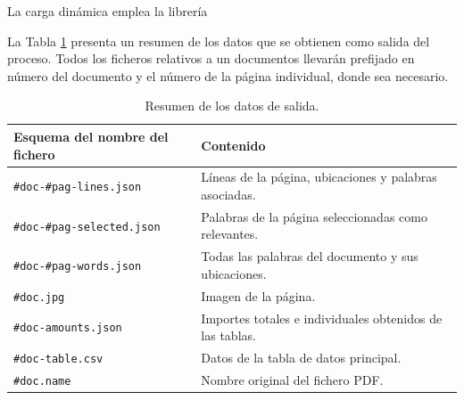 
La carga dinámica emplea la librería 









La Tabla \ref{tab:datos-de-salida} presenta un resumen de los datos que se obtienen como salida del proceso. Todos los ficheros relativos a un documentos llevarán prefijado en número del documento y el número de la página individual, donde sea necesario.

\begin{table}[ht]
    \centering
    \begin{tabular}{l l}
        Esquema del nombre del fichero & Contenido \\
        \hline
        \hline
        \verb|#doc-#pag-lines.json| & Líneas de la página, ubicaciones y palabras asociadas. \\
        \verb|#doc-#pag-selected.json| & Palabras de la página seleccionadas como relevantes. \\
        \verb|#doc-#pag-words.json| & Todas las palabras del documento y sus ubicaciones. \\
        \verb|#doc.jpg| & Imagen de la página. \\
        \verb|#doc-amounts.json| & Importes totales e individuales obtenidos de las tablas. \\
        \verb|#doc-table.csv| & Datos de la tabla de datos principal. \\
        \verb|#doc.name| & Nombre original del fichero PDF.\\
    \end{tabular}
    \caption{Resumen de los datos de salida.}    
    \label{tab:datos-de-salida}
\end{table}

